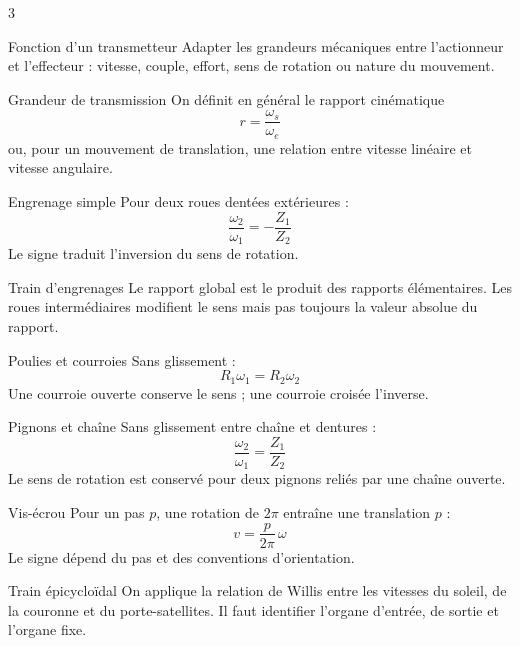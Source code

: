\documentclass[a3paper,landscape,10pt]{article}
\begin{document}
\begin{multicols}{3}

\begin{TLPosterBloc}{Fonction d'un transmetteur}
Adapter les grandeurs mécaniques entre l'actionneur et l'effecteur : vitesse, couple, effort, sens de rotation ou nature du mouvement.
\end{TLPosterBloc}

\begin{TLPosterBloc}{Grandeur de transmission}
On définit en général le rapport cinématique
\[
r=\frac{\omega_s}{\omega_e}
\]
ou, pour un mouvement de translation, une relation entre vitesse linéaire et vitesse angulaire.
\end{TLPosterBloc}

\begin{TLPosterBloc}{Engrenage simple}
Pour deux roues dentées extérieures :
\[
\frac{\omega_2}{\omega_1}=-\frac{Z_1}{Z_2}
\]
Le signe traduit l'inversion du sens de rotation.
\end{TLPosterBloc}

\begin{TLPosterBloc}{Train d'engrenages}
Le rapport global est le produit des rapports élémentaires. Les roues intermédiaires modifient le sens mais pas toujours la valeur absolue du rapport.
\end{TLPosterBloc}

\begin{TLPosterBloc}{Poulies et courroies}
Sans glissement :
\[
R_1\omega_1=R_2\omega_2
\]
Une courroie ouverte conserve le sens ; une courroie croisée l'inverse.
\end{TLPosterBloc}

\begin{TLPosterBloc}{Pignons et chaîne}
Sans glissement entre chaîne et dentures :
\[
\frac{\omega_2}{\omega_1}=\frac{Z_1}{Z_2}
\]
Le sens de rotation est conservé pour deux pignons reliés par une chaîne ouverte.
\end{TLPosterBloc}

\begin{TLPosterBloc}{Vis-écrou}
Pour un pas $p$, une rotation de $2\pi$ entraîne une translation $p$ :
\[
v=\frac{p}{2\pi}\,\omega
\]
Le signe dépend du pas et des conventions d'orientation.
\end{TLPosterBloc}

\begin{TLPosterBloc}{Train épicycloïdal}
On applique la relation de Willis entre les vitesses du soleil, de la couronne et du porte-satellites. Il faut identifier l'organe d'entrée, de sortie et l'organe fixe.
\end{TLPosterBloc}


\end{multicols}
\end{document}
